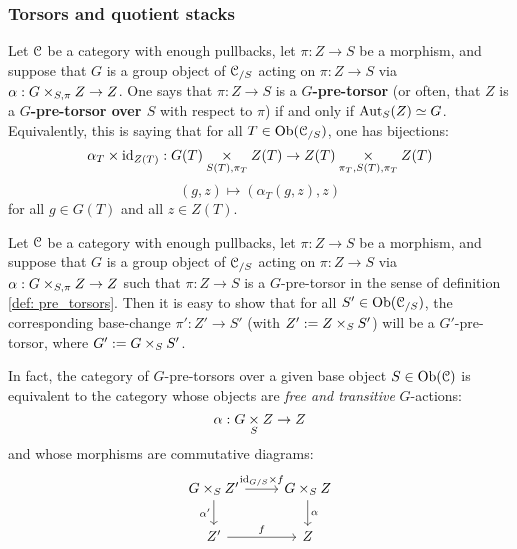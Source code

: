         \subsubsection{Torsors and quotient stacks}
            \begin{definition} \label{def: pre_torsors}
                Let $\mathcal{C}$ be a category with enough pullbacks, let $\pi: Z \to S$ be a morphism, and suppose that $G$ is a group object of $\mathcal{C}_{/S}$ acting on $\pi: Z \to S$ via $\alpha: G \x_{S, \pi} Z \to Z$. One says that $\pi: Z \to S$ is a \textbf{$G$-pre-torsor} (or often, that $Z$ is a \textbf{$G$-pre-torsor over $S$} with respect to $\pi$) if and only if $\mathrm{Aut}_S(Z) \simeq G$. Equivalently, this is saying that for all $T \in \mathrm{Ob}(\mathcal{C}_{/S})$, one has bijections:
                    $$\alpha_T \x \id_{Z(T)}: G(T) \x_{S(T), \pi_T} Z(T) \to Z(T) \x_{\pi_T, S(T), \pi_T} Z(T)$$
                    $$(g, z) \mapsto (\alpha_T(g, z), z)$$
                for all $g \in G(T)$ and all $z \in Z(T)$. 
            \end{definition}
            \begin{remark} \label{remark: base_changing_pre_torsors}
                Let $\mathcal{C}$ be a category with enough pullbacks, let $\pi: Z \to S$ be a morphism, and suppose that $G$ is a group object of $\mathcal{C}_{/S}$ acting on $\pi: Z \to S$ via $\alpha: G \x_{S, \pi} Z \to Z$ such that $\pi: Z \to S$ is a $G$-pre-torsor in the sense of definition \ref{def: pre_torsors}. Then it is easy to show that for all $S' \in \mathrm{Ob}(\mathcal{C}_{/S})$, the corresponding base-change $\pi': Z' \to S'$ (with $Z' := Z \x_S S'$) will be a $G'$-pre-torsor, where $G' := G \x_S S'$.
                
                In fact, the category of $G$-pre-torsors over a given base object $S \in \mathrm{Ob}(\mathcal{C})$ is equivalent to the category whose objects are \textit{free and transitive} $G$-actions:
                    $$\alpha: G \x_S Z \to Z$$
                and whose morphisms are commutative diagrams:
                    $$
                        \begin{tikzcd}
                        	{G \x_S Z'} & {G \x_S Z} \\
                        	{Z'} & Z
                        	\arrow["f", from=2-1, to=2-2]
                        	\arrow["\alpha", from=1-2, to=2-2]
                        	\arrow["{\alpha'}"', from=1-1, to=2-1]
                        	\arrow["{\id_{G/S} \x f}", from=1-1, to=1-2]
                        \end{tikzcd}
                    $$
            \end{remark}
